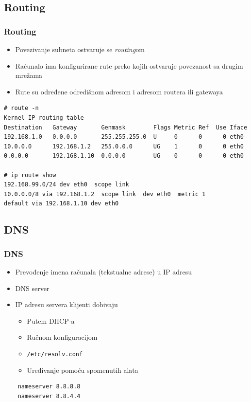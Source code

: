 \documentclass[t,table,usenames,dvipsnames]{beamer}
\begin{document}
\subsection{Routing}
\begin{frame}[fragile]
	\frametitle{Routing}
	\begin{itemize}
		\item Povezivanje subneta ostvaruje se \emph{routing}om
		\item Računalo ima konfigurirane rute preko kojih ostvaruje povezanost sa drugim mrežama
	\end{itemize}
	\begin{itemize}
		\item Rute su određene odredišnom adresom i adresom routera ili gatewaya
	\end{itemize}
	{\footnotesize \begin{verbatim}
# route -n
Kernel IP routing table
Destination   Gateway       Genmask        Flags Metric Ref  Use Iface
192.168.1.0   0.0.0.0       255.255.255.0  U     0      0      0 eth0
10.0.0.0      192.168.1.2   255.0.0.0      UG    1      0      0 eth0
0.0.0.0       192.168.1.10  0.0.0.0        UG    0      0      0 eth0

# ip route show
192.168.99.0/24 dev eth0  scope link
10.0.0.0/8 via 192.168.1.2  scope link  dev eth0  metric 1
default via 192.168.1.10 dev eth0
	\end{verbatim} }
\end{frame}

\subsection{DNS}
\begin{frame}[fragile]
	\frametitle{DNS}
	\begin{itemize}
		\item Prevođenje imena računala (tekstualne adrese) u IP adresu
		\item DNS server
		\item IP adresu servera klijenti dobivaju
		\begin{itemize}
			\item Putem DHCP-a
			\item Ručnom konfiguracijom
			\item[] \texttt{/etc/resolv.conf}
			\item[] Uređivanje pomoću spomenutih alata
		\end{itemize}
	\end{itemize}
	\begin{verbatim}
	nameserver 8.8.8.8
	nameserver 8.8.4.4
	\end{verbatim}
\end{frame}
\end{document}
